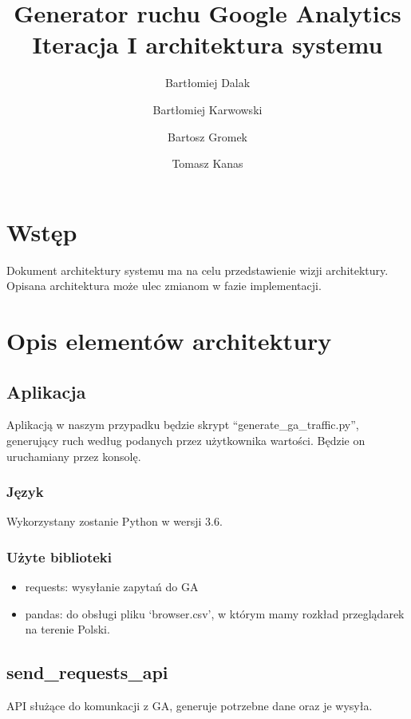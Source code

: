 \documentclass{article}
\title{Generator ruchu Google Analytics \\ Iteracja I architektura systemu}
\author{Bartłomiej Dalak \and Bartłomiej Karwowski \and Bartosz Gromek \and Tomasz Kanas}
\begin{document}
\maketitle

\section{Wstęp}

Dokument architektury systemu ma na celu przedstawienie wizji architektury. Opisana architektura może ulec zmianom w fazie implementacji.

\section{Opis elementów architektury}

\subsection{Aplikacja}

Aplikacją w naszym przypadku będzie skrypt ``generate\_ga\_traffic.py'', generujący ruch według podanych przez użytkownika wartości. Będzie on uruchamiany przez konsolę.

\subsubsection{Język}

Wykorzystany zostanie Python w wersji 3.6.

\subsubsection{Użyte biblioteki}

\begin{itemize}
\item requests: wysyłanie zapytań do GA
\item pandas: do obsługi pliku `browser.csv', w którym mamy rozkład przeglądarek na terenie Polski.
\end{itemize}

\subsection{send\_requests\_api}
API służące do komunkacji z GA, generuje potrzebne dane oraz je wysyła.
\end{document}
